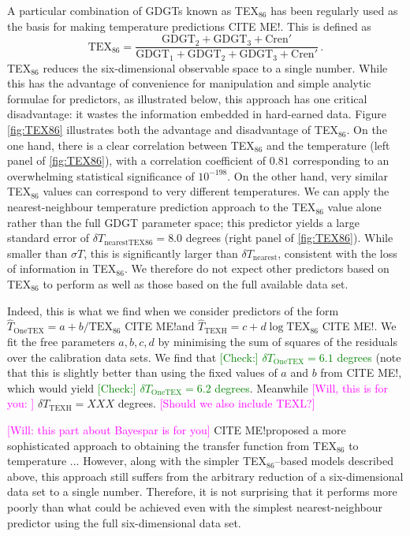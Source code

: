 \documentclass[rmp,aps,twocolumn]{revtex4-1}
\newcommand{\tocheck}[1]{\textcolor{green}{[Check:] #1}}
\newcommand{\citeme}{{\color{blue} CITE ME!}}
\newcommand{\ilya}[1]{\textcolor{magenta}{#1}}
\def\be{\begin{equation}}
\def\ee{\end{equation}}
\begin{document}
A particular combination of GDGTs known as TEX$_{86}$ has been regularly used as the basis for making temperature predictions \citeme.  This is defined as 
\be\label{eq:TEX86}
\mathrm{TEX}_{86} = \frac{\mathrm{GDGT}_2+\mathrm{GDGT}_3+\mathrm{Cren}'}{\mathrm{GDGT}_1+\mathrm{GDGT}_2+\mathrm{GDGT}_3+\mathrm{Cren}'}\, .
\ee
TEX$_{86}$ reduces the six-dimensional observable space to a single number.  While this has the advantage of convenience for manipulation and simple analytic formulae for predictors, as illustrated below, this approach has one critical disadvantage: it wastes the information embedded in hard-earned data.  Figure \ref{fig:TEX86} illustrates both the advantage and disadvantage of TEX$_{86}$.  On the one hand, there is a clear correlation between TEX$_{86}$ and the temperature (left panel of \autoref{fig:TEX86}), with a correlation coefficient of $0.81$ corresponding to an overwhelming statistical significance of $10^{-198}$.  On the other hand, very similar TEX$_{86}$ values can correspond to very different temperatures.  We can apply the nearest-neighbour temperature prediction approach to the TEX$_{86}$ value alone rather than the full GDGT parameter space; this predictor yields a large standard error of $\delta T_\mathrm{nearest TEX86} = 8.0$ degrees (right panel of \autoref{fig:TEX86}).  While smaller than $\sigma T$, this is significantly larger than $\delta T_\mathrm{nearest}$, consistent with the loss of information in TEX$_{86}$.  We therefore do not expect other predictors based on TEX$_{86}$ to perform as well as those based on the full available data set.

Indeed, this is what we find when we consider predictors of the form $\hat{T}_\mathrm{OneTEX}  = a + b / \mathrm{TEX}_{86}$ \citeme and $\hat{T}_\mathrm{TEXH}  = c + d \log \mathrm{TEX}_{86}$ \citeme.  We fit the free parameters $a, b, c, d$ by minimising the sum of squares of the residuals over the calibration data sets.  We find that \tocheck{$\delta T_\mathrm{OneTEX} = 6.1$ degrees} (note that this is slightly better than using the fixed values of $a$ and $b$ from \citeme, which would yield \tocheck{$\delta T_\mathrm{OneTEX} = 6.2$ degrees}.  Meanwhile \ilya{[Will, this is for you: ]} $\delta T_\mathrm{TEXH} = XXX$ degrees.  \ilya{[Should we also include TEXL?]}  

\ilya{[Will: this part about Bayespar is for you]} \citeme proposed a more sophisticated approach to obtaining the transfer function from TEX$_{86}$ to temperature ...  However, along with the simpler TEX$_{86}$--based models described above, this approach still suffers from the arbitrary reduction of a six-dimensional data set to a single number.  Therefore, it is not surprising that it performs more poorly than what could be achieved even with the simplest nearest-neighbour predictor using the full six-dimensional data set.
\end{document}
